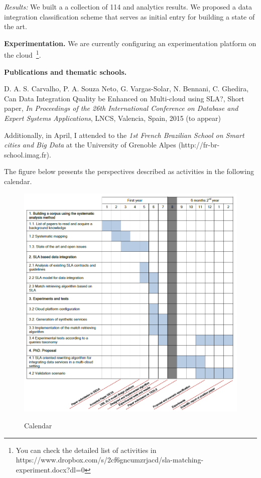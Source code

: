\documentclass[11pt,a4paper,oneside]{report}
\begin{document}
\noindent
{\em Results:} We built a  a collection of 114 and analytics results. We proposed a data integration classification scheme that serves as initial entry for building a state of the art. 


\noindent
\textbf{Experimentation.} We are currently  configuring an experimentation platform on the cloud~\footnote{You can check the detailed list of activities in https://www.dropbox.com/s/2cf6gncumzrjacd/sla-matching-experiment.docx?dl=0}.
%

\noindent
\textbf{Publications and thematic schools.}

\noindent
D. A. S. Carvalho, P. A. Souza Neto, G. Vargas-Solar, N. Bennani, C. Ghedira, Can Data Integration Quality be Enhanced on Multi-cloud using SLA?, Short paper, {\em In Proceedings of the 26th International Conference on Database and Expert Systems Applications}, LNCS, Valencia, Spain, 2015 (to appear)

\noindent
Additionally, in April, I attended to the \emph{1st French Brazilian School on Smart cities and Big Data} at the University of Grenoble Alpes (http://fr-br-school.imag.fr).

\noindent
The figure below presents the perspectives described as activities in the following calendar. 

\begin{figure}[!b]
\center
\includegraphics[scale=0.50]{calendario.png} \label{fig:calendar} \caption{Calendar}
\end{figure}



\end{document}
